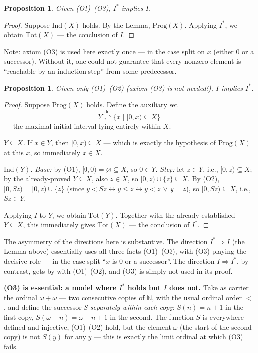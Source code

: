 \documentclass[12pt,a4paper]{article}
\theoremstyle{plain}
\newtheorem{proposition}[theorem]{Proposition}
\theoremstyle{definition}
\newcommand{\eqdef}{\mathrel{\overset{\mathrm{def}}{\rightleftharpoons}}}
\begin{document}
\begin{proposition}
Given (O1)--(O3), $I^*$ implies $I$.
\end{proposition}
\begin{proof}
Suppose $\mathrm{Ind}(X)$ holds. By the Lemma, $\mathrm{Prog}(X)$. Applying $I^*$, we obtain $\mathrm{Tot}(X)$ --- the conclusion of $I$.
\end{proof}
Note: axiom (O3) is used here exactly once --- in the case split on $x$ (either $0$ or a successor). Without it, one could not guarantee that every nonzero element is ``reachable by an induction step'' from some predecessor.

\begin{proposition}
Given only (O1)--(O2) (axiom (O3) is not needed!), $I$ implies $I^*$.
\end{proposition}
\begin{proof}
Suppose $\mathrm{Prog}(X)$ holds. Define the auxiliary set
$$Y \eqdef \{x \mid [0,x)\subseteq X\}$$
--- the maximal initial interval lying entirely within $X$.

\emph{$Y\subseteq X$.} If $x\in Y$, then $[0,x)\subseteq X$ --- which is exactly the hypothesis of $\mathrm{Prog}(X)$ at this $x$, so immediately $x\in X$.

\emph{$\mathrm{Ind}(Y)$.} \textit{Base:} by (O1), $[0,0)=\varnothing\subseteq X$, so $0\in Y$. \textit{Step:} let $z\in Y$, i.e., $[0,z)\subseteq X$; by the already-proved $Y\subseteq X$, also $z\in X$, so $[0,z)\cup\{z\}\subseteq X$. By (O2), $[0,Sz)=[0,z)\cup\{z\}$ (since $y<Sz \leftrightarrow y\leqslant z \leftrightarrow y<z\,\lor\,y=z$), so $[0,Sz)\subseteq X$, i.e., $Sz\in Y$.

Applying $I$ to $Y$, we obtain $\mathrm{Tot}(Y)$. Together with the already-established $Y\subseteq X$, this immediately gives $\mathrm{Tot}(X)$ --- the conclusion of $I^*$.
\end{proof}

The asymmetry of the directions here is substantive. The direction $I^*\Rightarrow I$ (the Lemma above) essentially uses all three facts (O1)--(O3), with (O3) playing the decisive role --- in the case split ``$x$ is $0$ or a successor''. The direction $I\Rightarrow I^*$, by contrast, gets by with (O1)--(O2), and (O3) is simply not used in its proof.

\textbf{(O3) is essential: a model where $I^*$ holds but $I$ does not.} Take as carrier the ordinal $\omega+\omega$ --- two consecutive copies of $\mathbb N$, with the usual ordinal order $<$, and define the successor $S$ \emph{separately within each copy}: $S(n)=n+1$ in the first copy, $S(\omega+n)=\omega+n+1$ in the second. The function $S$ is everywhere defined and injective, (O1)--(O2) hold, but the element $\omega$ (the start of the second copy) is not $S(y)$ for any $y$ --- this is exactly the limit ordinal at which (O3) fails.
\end{document}
